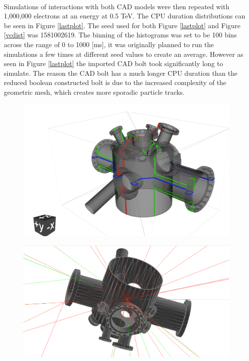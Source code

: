 \documentclass[12pt,a4paper]{article}
\begin{document}
\\
\noindent Simulations of interactions with both CAD models were then repeated with 1,000,000 electrons at an energy at 0.5 TeV. The CPU duration distributions can be seen in Figure \ref{lastplot}. The seed used for both Figure \ref{lastplot} and Figure \ref{vcdist} was 1581002619. The binning of the histograms was set to be 100 bins across the range of 0 to 1000 [ms], it was originally planned to run the simulations a few times at different seed values to create an average. However as seen in Figure \ref{lastplot} the imported CAD bolt took significantly long to simulate. The reason the CAD bolt has a much longer CPU duration than the reduced boolean constructed bolt is due to the increased complexity of the geometric mesh, which creates more sporadic particle tracks.
\\
\begin{figure}[h!]
\centering
\begin{minipage}{.5\textwidth}
  \centering
  \includegraphics[height=0.5\linewidth]{Images//VC//VC1.png}
  \label{vcvtk}
\end{minipage}%
\begin{minipage}{.5\textwidth}
  \centering
  \includegraphics[height=0.5\linewidth]{Images//VC//VC4.png}
  \label{vcbdsim}
\end{minipage}%
\end{figure}
\end{document}
